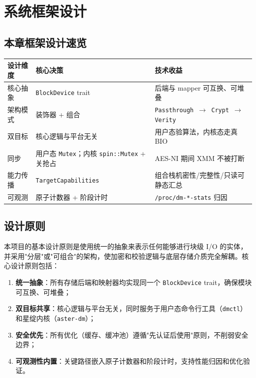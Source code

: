\chapter{系统框架设计}

\section*{本章框架设计速览}

\begin{table}[H]
    \centering
    \begin{tabular}{p{}p{}p{}}
        \toprule
        \textbf{设计维度} & \textbf{核心决策} & \textbf{技术收益} \\
        \midrule
        核心抽象 & \texttt{BlockDevice} trait & 后端与 mapper 可互换、可堆叠 \\
        架构模式 & 装饰器 + 组合 & \texttt{Passthrough $\to$ Crypt $\to$ Verity} \\
        双目标 & 核心逻辑与平台无关 & 用户态验算法，内核态走真 BIO \\
        同步 & 用户态 \texttt{Mutex}；内核 \texttt{spin::Mutex} + 关抢占 & AES-NI 期间 XMM 不被打断 \\
        能力传播 & \texttt{TargetCapabilities} & 组合栈机密性/完整性/只读可静态汇总 \\
        可观测 & 原子计数器 + 阶段计时 & \texttt{/proc/dm-*-stats} 归因 \\
        \bottomrule
    \end{tabular}
\end{table}

\section{设计原则}

本项目的基本设计原则是使用统一的抽象来表示任何能够进行块级 I/O 的实体，并采用"分层"或"可组合"的架构，使加密和校验逻辑与底层存储介质完全解耦。核心设计原则包括：

\begin{enumerate}
    \item \textbf{统一抽象}：所有存储后端和映射器均实现同一个 \texttt{BlockDevice} trait，确保模块可互换、可堆叠；
    \item \textbf{双目标共享}：核心逻辑与平台无关，同时服务于用户态命令行工具（\texttt{dmctl}）和星绽内核（\texttt{aster-dm}）；
    \item \textbf{安全优先}：所有优化（缓存、缓冲池）遵循"先认证后使用"原则，不削弱安全边界；
    \item \textbf{可观测性内置}：关键路径嵌入原子计数器和阶段计时，支持性能归因和优化验证。
\end{enumerate}

